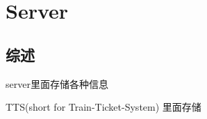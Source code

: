 \section{Server}

\subsection{综述}
    server里面存储各种信息

    TTS(short for Train-Ticket-System)
    里面存储